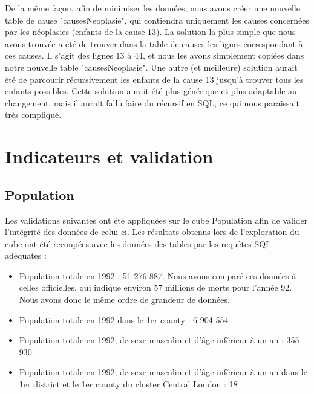     De la même façon, afin de minimiser les données, nous avons créer une nouvelle table de cause "causesNeoplasie", qui contiendra uniquement les causes concernées par les néoplasies (enfants de la cause 13). La solution la plus simple que nous avons trouvée a été de trouver dans la table de causes les lignes correspondant à ces causes. Il s'agit des lignes 13 à 44, et nous les avons simplement copiées dans notre nouvelle table "causesNeoplasie". Une autre (et meilleure) solution aurait été de parcourir récursivement les enfants de la cause 13 jusqu'à trouver tous les enfants possibles. Cette solution aurait été plus générique et plus adaptable au changement, mais il aurait fallu faire du récursif en SQL, ce qui nous paraissait très compliqué.


\pagebreak

\chapter{Indicateurs et validation}

\section{Population}
Les validations suivantes ont été appliquées sur le cube Population afin de valider l'intégrité des données de celui-ci. Les résultats obtenus lors de l'exploration du cube ont été recoupées avec les données des tables par les requêtes SQL adéquates :
\begin{itemize}
    \item Population totale en 1992 : 51 276 887. Nous avons comparé ces données à celles officielles, qui indique environ 57 millions de morts pour l'année 92. Nous avons donc le même ordre de grandeur de données.
    \item Population totale en 1992 dans le 1er county : 6 904 554
    \item Population totale en 1992, de sexe masculin et d'âge inférieur à un an : 355 930
    \item Population totale en 1992, de sexe masculin et d'âge inférieur à un an dans le 1er district et le 1er county du cluster Central London : 18
\end{itemize}


